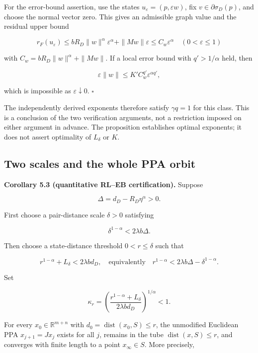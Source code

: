\documentclass[11pt,a4paper]{article}
\theoremstyle{plain}
\theoremstyle{definition}
\theoremstyle{remark}
\begin{document}
For the error-bound assertion, use the states
\(u_\varepsilon=(p,\varepsilon w)\), fix \(v\in\partial\sigma_D(p)\),
and choose the normal vector zero. This gives an admissible graph value
and the residual upper bound

\[
r_F(u_\varepsilon)
\le bR_D\|w\|^\alpha\varepsilon^\alpha
+\|Mw\|\varepsilon
\le C_w\varepsilon^\alpha
\quad(0<\varepsilon\le1)
\tag{5.18}
\]

with \(C_w=bR_D\|w\|^\alpha+\|Mw\|\). If a local error bound with
\(q'>1/\alpha\) held, then

\[
\varepsilon\|w\|\le K' C_w^{q'}\varepsilon^{\alpha q'},
\]

which is impossible as \(\varepsilon\downarrow0\). \(\square\)

The independently derived exponents therefore satisfy \(\gamma q=1\) for
this class. This is a conclusion of the two verification arguments, not
a restriction imposed on either argument in advance. The proposition
establishes optimal exponents; it does not assert optimality of
\(L_\delta\) or \(K\).

\hypertarget{two-scales-and-the-whole-ppa-orbit}{%
\subsection{Two scales and the whole PPA
orbit}\label{two-scales-and-the-whole-ppa-orbit}}

\textbf{Corollary 5.3 (quantitative RL--EB certification).} Suppose

\[
\Delta=d_D-R_D\eta^\alpha>0.
\tag{5.19}
\]

First choose a pair-distance scale \(\delta>0\) satisfying

\[
\delta^{1-\alpha}<2\lambda b\Delta.
\tag{5.20}
\]

Then choose a state-distance threshold \(0<r\le\delta\) such that

\[
r^{1-\alpha}+L_\delta<2\lambda bd_D,
\quad\text{equivalently}\quad
r^{1-\alpha}<2\lambda b\Delta-\delta^{1-\alpha}.
\tag{5.21}
\]

Set

\[
\kappa_r=
\left(\frac{r^{1-\alpha}+L_\delta}{2\lambda bd_D}\right)^{1/\alpha}<1.
\tag{5.22}
\]

For every \(x_0\in\mathbb R^{m+n}\) with
\(d_0=\operatorname{dist}(x_0,S)\le r\), the unmodified Euclidean PPA
\(x_{j+1}=Jx_j\) exists for all \(j\), remains in the tube
\(\operatorname{dist}(x,S)\le r\), and converges with finite length to a
point \(x_\infty\in S\). More precisely,
\end{document}
